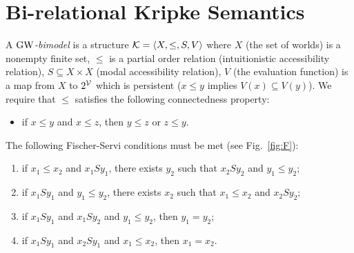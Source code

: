 \newcommand{\ymax}{y_{\mathrm{max}}}
\newcommand{\ymin}{y_{\mathrm{min}}}
\newcommand{\LBMR}{\mathbf{Lbmr}}%
\newcommand{\height}[1]{\mathrm{h}(#1)}
\newcommand{\clust}[1]{[#1]_\sim}




\section{Bi-relational Kripke Semantics}
\label{sec:bimodels}





A \emph{$\mbox{$\mathrm{GW}$}$-bimodel} is a structure $\mathcal{K}=\langle X,\leq,S,V \rangle$ where
$X$ (the set of worlds) is a nonempty finite set, $\leq$ is a partial
order relation (intuitionistic accessibility relation), $S\subseteq X \times X$ (modal accessibility relation),
$V$ (the evaluation function)
is a map from $X$ to $2^{\mathcal{V}}$ which is persistent ($x \leq y$ implies
$V(x)\subseteq V(y)$).  We require that $\leq$ satisfies the following
connectedness property:
\begin{itemize}
\item  if $x \leq y$ and $x \leq z$, then $y\leq z$ or $z\leq y$.
\end{itemize}
The  following Fischer-Servi conditions must be met (see Fig.~\ref{fig:F}):

\begin{enumerate}[label=(F\arabic*), ref=(F\arabic*),leftmargin=*]
\item\label{F1} if $x_1\leq x_2$ and $x_1 S y_1$, there exists $y_2$
  such that $x_2 S y_2$ and $y_1\leq y_2$;
  
  
\item\label{F2} if $x_1 S y_1$ and $y_1\leq y_2$, there exists $x_2$
  such that $x_1\leq x_2$ and $x_2 S y_2$;
  

\item\label{F3} if $x_1 S y_1$ and $x_1 S y_2$ and $y_1 \leq y_2$,
  then $y_1=y_2$;
  
\item\label{F4} if $x_1 S y_1$ and $x_2 S y_1$ and $x_1\leq x_2$, then
  $x_1= x_2$.
\end{enumerate}  



